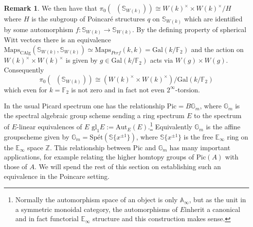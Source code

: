 \documentclass{article}
\DeclareMathOperator{\Picp}{Pic^p} %
\newcommand{\pic}{\ensuremath{\mathrm{Pic}}}
\theoremstyle{definition}
\newtheorem{remark}[equation]{Remark}
\begin{document}
\begin{remark}
We then have that $\pi_0(\Picp(\mathbb{S}_{W(k)}))\cong W(k)^\times \times W(k)^\times/H$ where $H$ is the subgroup of Poincar{\'e} structures $q$ on $\mathbb{S}_{W(k)}$ which are identified by some automorphism $f:\mathbb{S}_{W(k)}\to \mathbb{S}_{W(k)}$. By the defining property of spherical Witt vectors there is an equivalence $\mathrm{Maps}_{\mathrm{CAlg}}(\mathbb{S}_{W(k)}, \mathbb{S}_{W(k)})\simeq \mathrm{Maps}_{Perf}(k,k)=\mathrm{Gal}(k/\mathbb{F}_2)$ and the action on $W(k)^\times \times W(k)^\times$ is given by $g\in \mathrm{Gal}(k/\mathbb{F}_2)$ acts via $W(g)\times W(g)$. Consequently \[\pi_0(\Picp(\mathbb{S}_{W(k)}))\cong (W(k)^\times \times W(k)^\times) /\mathrm{Gal}(k/\mathbb{F}_2)\] which even for $k=\mathbb{F}_2$ is not zero and in fact not even $2^\infty$-torsion. 
\end{remark}

In the usual Picard spectrum one has the relationship $\pic = B\mathbb{G}_m$, where $\mathbb{G}_m$ is the spectral algebraic group scheme sending a ring spectrum $E$ to the spectrum of $E$-linear equivalences of $E$ $\mathrm{gl}_1E:=\mathrm{Aut}_E(E)$.\footnote{Normally the automorphism space of an object is only $\mathbb{A}_\infty$, but as the unit in a symmetric monoidal category, the automorphisms of $E$inherit a canonical and in fact functorial $\mathbb{E}_\infty$ structure and this construction makes sense.} Equivalently $\mathbb{G}_m$ is the affine groupscheme given by $\mathbb{G}_m=\mathrm{Sp}\textrm{\'et}(\mathbb{S}\{x^{\pm 1}\})$, where $\mathbb{S}\{x^{\pm 1}\}$ is the free $\mathbb{E}_\infty$ ring on the $\mathbb{E}_\infty$ space $\mathbb{Z}$. This relationship between $\pic$ and $\mathbb{G}_m$ has many important applications, for example relating the higher homtopy groups of $\pic(A)$ with those of $A$. We will spend the rest of this section on establishing such an equivalence in the Poincare setting.
\end{document}
